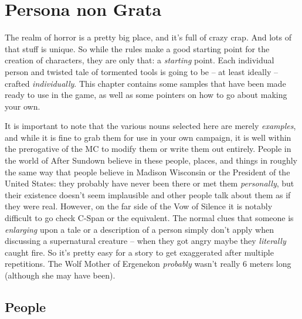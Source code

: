 \chapter{Persona non Grata}

The realm of horror is a pretty big place, and it's full of crazy crap. And lots of that stuff is unique. So while the rules make a good starting point for the creation of characters, they are only that: a \textit{starting} point. Each individual person and twisted tale of tormented tools is going to be -- at least ideally -- crafted \textit{individually}. This chapter contains some samples that have been made ready to use in the game, as well as some pointers on how to go about making your own.

It is important to note that the various nouns selected here are merely \textit{examples}, and while it is fine to grab them for use in your own campaign, it is well within the prerogative of the MC to modify them or write them out entirely. People in the world of After Sundown believe in these people, places, and things in roughly the same way that people believe in Madison Wisconsin or the President of the United States: they probably have never been there or met them \textit{personally}, but their existence doesn't seem implausible and other people talk about them as if they were real. However, on the far side of the Vow of Silence it is notably difficult to go check C-Span or the equivalent. The normal clues that someone is \textit{enlarging} upon a tale or a description of a person simply don't apply when discussing a supernatural creature -- when they got angry maybe they \textit{literally} caught fire. So it's pretty easy for a story to get exaggerated after multiple repetitions. The Wolf Mother of Ergenekon \textit{probably} wasn't really 6 meters long (although she may have been). 

\section{People}

